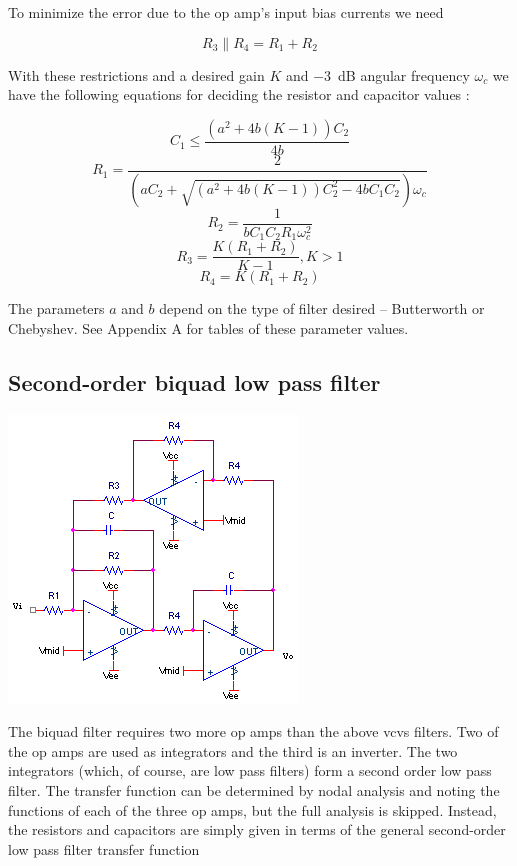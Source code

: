 To minimize the error due to the op amp's input bias currents we need

\begin{equation}
R_3 \parallel R_4 = R_1 + R_2
\end{equation}

With these restrictions and a desired gain $K$ and \SI{-3}{\dB} angular frequency $\omega_{c}$ we have the following equations for deciding the resistor and capacitor values \autocite[118-119]{op-amp-circuits-johnson}:

\begin{equation}
C_1 \leq \frac{(a^2+4b(K-1))C_2}{4b}
\end{equation}
\begin{equation}
R_1 = \frac{2}{(aC_2+\sqrt{(a^2+4b(K-1))C_2^2 - 4b C_1 C_2})\omega_{c}}
\end{equation}
\begin{equation}
R_2 = \frac{1}{bC_1 C_2 R_1\omega_{c}^2}
\end{equation}
\begin{equation}
R_3 = \frac{K(R_1 + R_2)}{K-1}, K > 1
\end{equation}
\begin{equation}
R_4 = K(R_1 + R_2)
\end{equation}

The parameters $a$ and $b$ depend on the type of filter desired -- Butterworth or Chebyshev. See Appendix A for tables of these parameter values.

\subsection{Second-order biquad low pass filter}
\begin{center}
	\includegraphics{schematics/2ndorderbiquadLPfilter.PNG}
\end{center}
The biquad filter requires two more op amps than the above \ac{vcvs} filters.
Two of the op amps are used as integrators and the third is an inverter.
The two integrators (which, of course, are low pass filters) form a second order low pass filter.
The transfer function can be determined by nodal analysis and noting the functions of each of the three op amps, but the full analysis is skipped.
Instead, the resistors and capacitors are simply given in terms of the general second-order low pass filter transfer function

